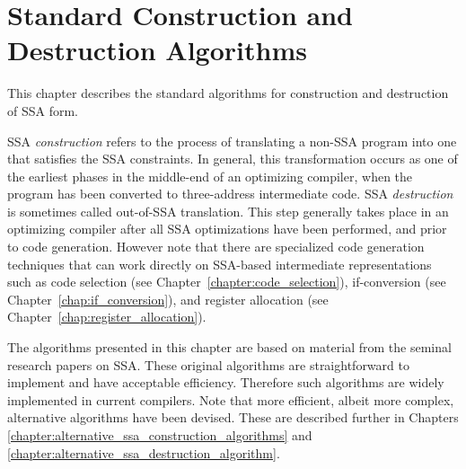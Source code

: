 \chapter{Standard Construction and Destruction Algorithms }
\label{chap:classical_construction}

\graphicspath{{Figures/}{classical_construction_algorithm/Figures/}{part1/classical_construction_algorithm/Figures/}}





This chapter describes the standard algorithms for construction and
destruction of SSA form.

SSA \emph{construction} refers to the process of translating a non-SSA program into
one that satisfies the SSA constraints. In general, this transformation
occurs as one of the
earliest phases in the middle-end of an optimizing compiler, when the program
has been converted to three-address intermediate code.
SSA \emph{destruction} is sometimes called out-of-SSA translation. This step
generally
takes place in an optimizing compiler after all SSA optimizations have
been performed, and prior to code generation. However note that there are
specialized code generation techniques that can work directly on SSA-based
intermediate representations such as code selection (see
Chapter~\ref{chapter:code_selection}), if-conversion (see
Chapter~\ref{chap:if_conversion}),
and register allocation (see Chapter~\ref{chap:register_allocation}).

The algorithms presented in this chapter are
based on material from the seminal research papers on SSA.
These original algorithms are 
straightforward to implement and have acceptable efficiency.
Therefore such algorithms
are widely implemented in current compilers.
Note that more
efficient, albeit more complex, alternative algorithms have been devised.
These are described further in Chapters 
\ref{chapter:alternative_ssa_construction_algorithms}
and
\ref{chapter:alternative_ssa_destruction_algorithm}.


